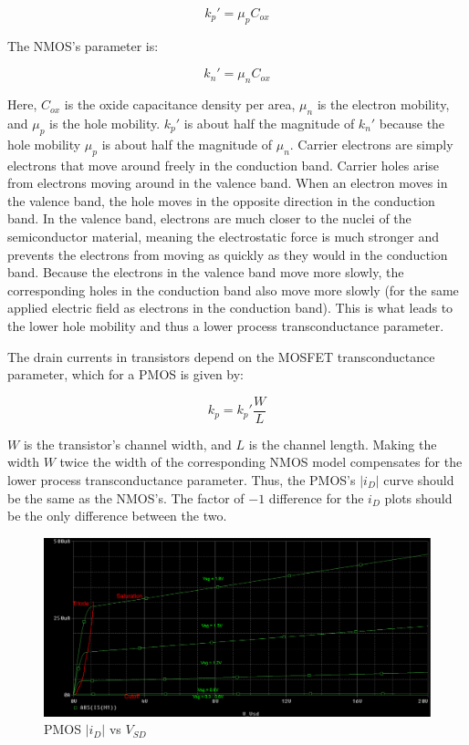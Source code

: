 \begin{equation}
	\label{eq:pmos_trans}
	k_p' = \mu _{p} C_{ox}
\end{equation}

The NMOS's parameter is:

\begin{equation}
	\label{eq:nmos_trans}
	k_n' = \mu _{n} C_{ox}
\end{equation}

Here, $C_{ox}$ is the oxide capacitance density per area, $\mu _{n}$ is the electron mobility, and $\mu _{p}$ is the hole mobility. $k_p'$ is about half the magnitude of $k_n'$ because the hole mobility $\mu _{p}$ is about half the magnitude of $\mu _{n}$. Carrier electrons are simply electrons that move around freely in the conduction band. Carrier holes arise from electrons moving around in the valence band. When an electron moves in the valence band, the hole moves in the opposite direction in the conduction band. In the valence band, electrons are much closer to the nuclei of the semiconductor material, meaning the electrostatic force is much stronger and prevents the electrons from moving as quickly as they would in the conduction band. Because the electrons in the valence band move more slowly, the corresponding holes in the conduction band also move more slowly (for the same applied electric field as electrons in the conduction band). This is what leads to the lower hole mobility and thus a lower process transconductance parameter.

The drain currents in transistors depend on the MOSFET transconductance parameter, which for a PMOS is given by:

\begin{equation}
	\label{eq:pmos_fettrans}
	k_p = k_p' \frac{W}{L}
\end{equation}


$W$ is the transistor's channel width, and $L$ is the channel length. Making the width $W$ twice the width of the corresponding NMOS model compensates for the lower process transconductance parameter. Thus, the PMOS's $|i_D|$ curve should be the same as the NMOS's. The factor of $-1$ difference for the $i_D$ plots should be the only difference between the two.

\FloatBarrier

\begin{figure}[h!]
	\centering
	\includegraphics[scale=0.25]{./images/circuit2_vsd_sweep_abs.PNG}
	\caption{PMOS $|i_D|$ vs $V_{SD}$}
	\label{fig:circuit2_vsd_sweep_abs}
\end{figure}

